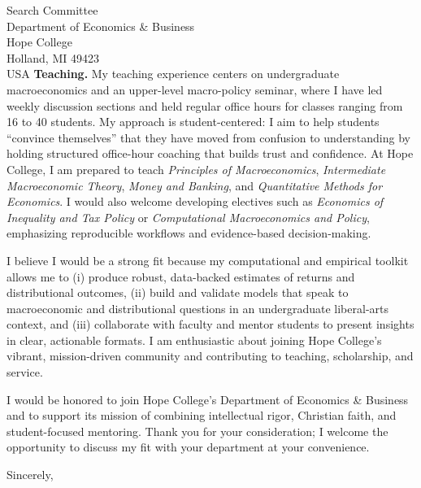 \documentclass[11pt,letterpaper]{letter}
\begin{document}
\begin{letter}{Search Committee \\
Department of Economics \& Business \\
Hope College \\
Holland, MI 49423 \\ USA}
\textbf{Teaching.} My teaching experience centers on undergraduate macroeconomics and an upper-level macro-policy seminar, where I have led weekly discussion sections and held regular office hours for classes ranging from 16 to 40 students. My approach is student-centered: I aim to help students “convince themselves” that they have moved from confusion to understanding by holding structured office-hour coaching that builds trust and confidence. At Hope College, I am prepared to teach \textit{Principles of Macroeconomics}, \textit{Intermediate Macroeconomic Theory}, \textit{Money and Banking}, and \textit{Quantitative Methods for Economics}. I would also welcome developing electives such as \textit{Economics of Inequality and Tax Policy} or \textit{Computational Macroeconomics and Policy}, emphasizing reproducible workflows and evidence-based decision-making.

I believe I would be a strong fit because my computational and empirical toolkit allows me to (i) produce robust, data-backed estimates of returns and distributional outcomes, (ii) build and validate models that speak to macroeconomic and distributional questions in an undergraduate liberal-arts context, and (iii) collaborate with faculty and mentor students to present insights in clear, actionable formats. I am enthusiastic about joining Hope College’s vibrant, mission-driven community and contributing to teaching, scholarship, and service.

I would be honored to join Hope College’s Department of Economics \& Business and to support its mission of combining intellectual rigor, Christian faith, and student-focused mentoring. Thank you for your consideration; I welcome the opportunity to discuss my fit with your department at your convenience.

\closing{Sincerely,}

\end{letter}
\end{document}
